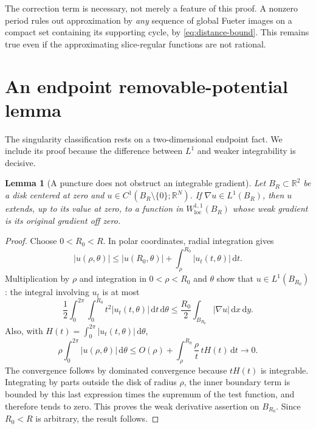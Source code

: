 \documentclass[11pt,a4paper]{article}
\numberwithin{equation}{section}
\newtheorem{lemma}[theorem]{Lemma}
\theoremstyle{definition}
\theoremstyle{remark}
\newcommand{\R}{\mathbb R}
\newcommand{\dd}{\,\mathrm d}
\begin{document}
The correction term is necessary, not merely a feature of this proof. A
nonzero period rules out approximation by \emph{any} sequence of global
Fueter images on a compact set containing its supporting cycle, by
\eqref{eq:distance-bound}. This remains true even if the approximating
slice-regular functions are not rational.

\section{An endpoint removable-potential lemma}
\label{sec:weak}

The singularity classification rests on a two-dimensional endpoint fact.
We include its proof because the difference between $L^1$ and weaker
integrability is decisive.

\begin{lemma}[A puncture does not obstruct an integrable gradient]
\label{lem:W11}
Let $B_R\subset\R^2$ be a disk centered at zero and
$u\in C^1(B_R\setminus\{0\};\R^N)$. If
$\nabla u\in L^1(B_R)$, then $u$ extends, up to its value at zero, to a
function in $W^{1,1}_{\mathrm{loc}}(B_R)$ whose weak gradient is its original
gradient off zero.
\end{lemma}
\begin{proof}
Choose $0<R_0<R$. In polar coordinates, radial integration gives
\[
 |u(\rho,\theta)|\le |u(R_0,\theta)|+
 \int_\rho^{R_0}|u_t(t,\theta)|\dd t.
\]
Multiplication by $\rho$ and integration in $0<\rho<R_0$ and $\theta$ show
that $u\in L^1(B_{R_0})$: the integral involving $u_t$ is at most
\[
 \frac12\int_0^{2\pi}\int_0^{R_0}t^2|u_t(t,\theta)|\dd t\dd\theta
 \le\frac{R_0}{2}\int_{B_{R_0}}|\nabla u|\dd x\dd y.
\]
Also, with $H(t)=\int_0^{2\pi}|u_t(t,\theta)|\dd\theta$,
\[
 \rho\int_0^{2\pi}|u(\rho,\theta)|\dd\theta
 \le O(\rho)+\int_\rho^{R_0}\frac\rho t\,tH(t)\dd t\longrightarrow0.
\]
The convergence follows by dominated convergence because $tH(t)$ is
integrable. Integrating by parts outside the disk of radius $\rho$, the
inner boundary term is bounded by this last expression times the supremum
of the test function, and therefore tends to zero. This proves the weak
derivative assertion on $B_{R_0}$. Since $R_0<R$ is arbitrary, the result
follows.
\end{proof}
\end{document}
